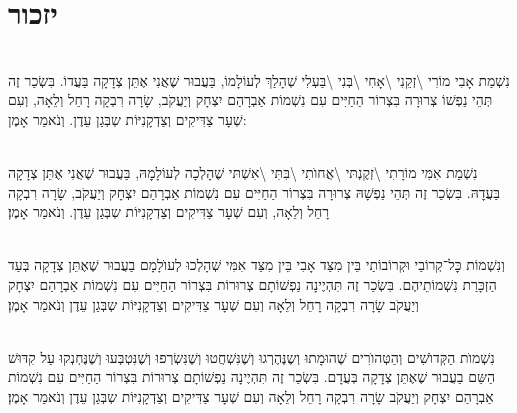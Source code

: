 \documentclass[twoside, openany, parskip=half, 11pt]{book}
\begin{document}
\vfill
{}


\sepline



\chapter[יזכור]{ יזכור }

 

\\
נִשְׁמַת אָבִי מוֹרִי \textbackslash זְקֵנִי \textbackslash אָחִי \textbackslash בְּנִי \textbackslash בַּעְלִי  שְׁהָלַךְ לְעוֹלָמוֹ, בַּעֲבוּר שֶׁאֲנִי אֶתֵּן צְדָקָה בַּעֲדוֹ. בִּשְׂכַר זֶה תְּהֵי נַפְשׁוֹ צְרוּרָה בִּצְרוֹר הַחַיִּים עִם נִשְׁמוֹת אַבְרָהַם יִצְחָק וְיַעֲקֹב, שָׂרָה רִבְקָה רָחֵל וְלֵאָה, וְעִם שְׁעָר צַדִּיקִים וְצַדְקָנִיּוֹת שְבְּגַן עֵדֶן. וְנֹאמַר אָמֶן:

\\
נִשְׁמַת אִמִּי מוֹרָתִי \textbackslash זְקֶנְתּי \textbackslash אֲחוׂתִי \textbackslash בִּתִּי \textbackslash אִשְׁתּי
שֶׁהָלְכָה לְעוֹלָמׇהּ, בַּעֲבוּר שֶׁאֲנִי אֶתֵּן צְדָקָה בַּעֲדׇהּ. בִּשְׂכַר זֶה תְּהֵי נַפְשָׁהּ צְרוּרָה בִּצְרוֹר הַחַיִּים עִם נִשְׁמוֹת אַבְרָהַם יִצְחָק וְיַעֲקֹב, שָׂרָה רִבְקָה רָחֵל וְלֵאָה, וְעִם שְׁעָר צַדִּיקִים וְצַדְקָנִיּוֹת שְבְּגַן עֵדֶן. וְנֹאמַר אָמֶן׃

 \\
וְנִשְׁמוֹת כׇּל־קְרוֹבַי וּקְרוֹבוֹתַי בֵּין מִצַּד אָבִי בֵּין מִצַּד אִמִּי
שְׁהָלְכוּ לְעוׂלָמָם
בַעֲבוּר שֶׁאֶתֵּן צְדָקָה בְּעַד הַזְכָּרַת נִשְׁמוֹתֵיהֶם. בִּשְׂכַר זֶה תִּהְיֶינָה נַפְשׁוֹתָם צְרוּרוֹת בִּצְרוֹר הַחַיִּים עִם נִשְׁמוֹת אַבְרָהַם יִצְחָק וְיַעֲקֹב שָׂרָה רִבְקָה רָחֵל וְלֵאָה וְעִם שְׁעָר צַדִּיקִים וְצַדְקָנִיּוֹת שְבְּגַן עֵדֶן וְנֹאמַר אָמֶן׃



\\
נִשְׁמוׂת הַקְּדוׂשִׁים וְהַטְּהוׂרִים
שֶׁהוּמָתוּ וְשֶנֶּהֶרְגוּ וְשֶׁנִּשְׁחֲטוּ וְשֶׁנִּשְׂרְפוּ וְשֶׁנִּטְבְּעוּ וְשֶׁנֶּחְנְקוּ עַל קִדּוּשׁ הַשֵּם בַעֲבוּר שֶׁאֶתֵּן צְדָקָה בְּעֲדָם. בִּשְׂכַר זֶה תִּהְיֶינָה נַפְשׁוֹתָם צְרוּרוֹת בִּצְרוֹר הַחַיִּים עִם נִשְׁמוֹת אַבְרָהַם יִצְחָק וְיַעֲקֹב שָׂרָה רִבְקָה רָחֵל וְלֵאָה וְעִם שְׁעָר צַדִּיקִים וְצַדְקָנִיּוֹת שְבְּגַן עֵדֶן וְנֹאמַר אָמֶן׃
%
%
%
\end{document}
